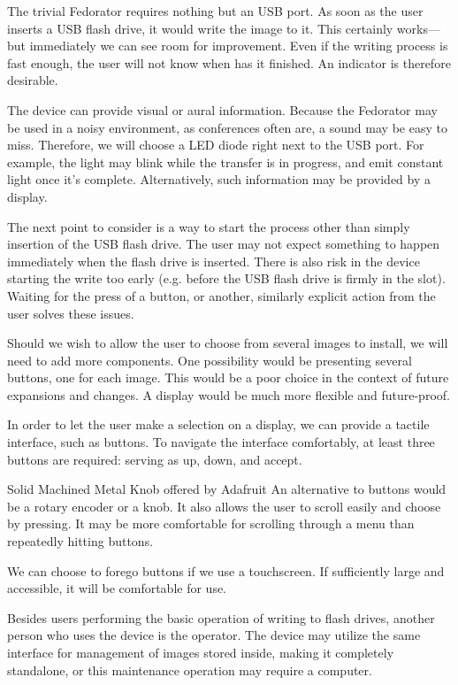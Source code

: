         The trivial Fedorator requires nothing but an USB port.  As soon as the user inserts a USB flash drive, it would write the image to it.  This certainly works—but immediately we can see room for improvement.  Even if the writing process is fast enough, the user will not know when has it finished.  An indicator is therefore desirable.
        
        The device can provide visual or aural information.  Because the Fedorator may be used in a noisy environment, as conferences often are, a sound may be easy to miss.  Therefore, we will choose a LED diode right next to the USB port.  For example, the light may blink while the transfer is in progress, and emit constant light once it's complete.  Alternatively, such information may be provided by a display.
        
        The next point to consider is a way to start the process other than simply insertion of the USB flash drive.  The user may not expect something to happen immediately when the flash drive is inserted.  There is also risk in the device starting the write too early (e.g. before the USB flash drive is firmly in the slot).  Waiting for the press of a button, or another, similarly explicit action from the user solves these issues.
        
        Should we wish to allow the user to choose from several images to install, we will need to add more components.  One possibility would be presenting several buttons, one for each image.  This would be a poor choice in the context of future expansions and changes.  A display would be much more flexible and future-proof.
        
        In order to let the user make a selection on a display, we can provide a tactile interface, such as buttons.  To navigate the interface comfortably, at least three buttons are required: serving as up, down, and accept.
        
            {Solid Machined Metal Knob offered by Adafruit  \cite{adafruit-knob}}
        An alternative to buttons would be a rotary encoder or a knob.  It also allows the user to scroll easily and choose by pressing.  It may be more comfortable for scrolling through a menu than repeatedly hitting buttons.
        
        We can choose to forego buttons if we use a touchscreen.  If sufficiently large and accessible, it will be comfortable for use.
        
        Besides users performing the basic operation of writing to flash drives, another person who uses the device is the operator.  The device may utilize the same interface for management of images stored inside, making it completely standalone, or this maintenance operation may require a computer.
    
